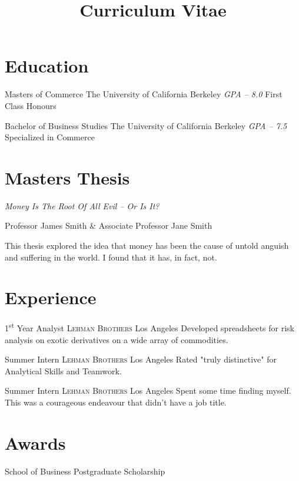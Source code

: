 \documentclass[11pt,a4paper,sans]{moderncv}
\title{Curriculum Vitae}
\begin{document}
\makecvtitle %

\section{Education}

        {Masters of Commerce}
        {The University of California}
        {Berkeley}
        {\textit{GPA -- 8.0}}
        {First Class Honours}  %

        {Bachelor of Business Studies}
        {The University of California}
        {Berkeley}
        {\textit{GPA -- 7.5}}
        {Specialized in Commerce}

\section{Masters Thesis}
       {\emph{Money Is The Root Of All Evil -- Or Is It?}}

       {Professor James Smith \& Associate Professor Jane Smith}

       {This thesis explored the idea that money has been the cause of untold anguish
        and suffering in the world. I found that it has, in fact, not.}

\section{Experience}
        {1\textsuperscript{st} Year Analyst}
        {\textsc{Lehman Brothers}}
        {Los Angeles}
        {}
        {Developed spreadsheets for risk analysis on exotic derivatives on a wide array of commodities.}

        {Summer Intern}
        {\textsc{Lehman Brothers}}
        {Los Angeles}
        {}
        {Rated "truly distinctive" for Analytical Skills and Teamwork.}

        {Summer Intern}
        {\textsc{Lehman Brothers}}
        {Los Angeles}
        {}
        {Spent some time finding myself.
         This was a courageous endeavour that didn't have a job title. }

\section{Awards}
       {School of Business Postgraduate Scholarship}
\end{document}
